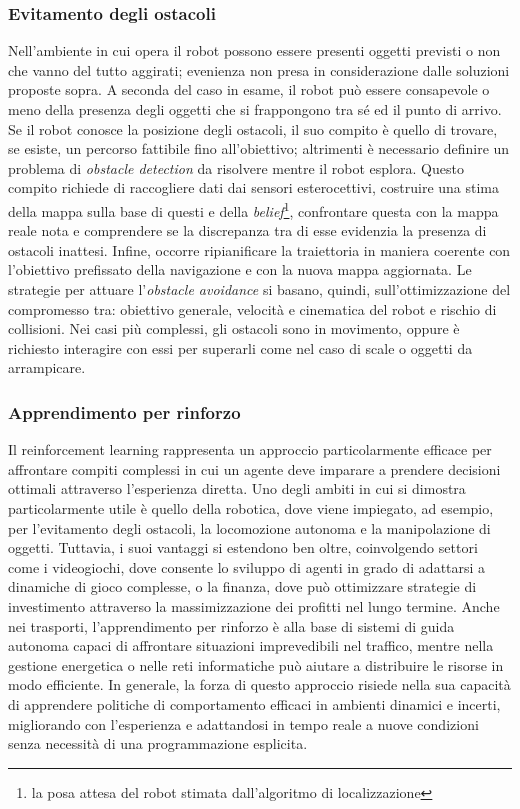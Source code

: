 \subsubsection{Evitamento degli ostacoli}
Nell'ambiente in cui opera il robot possono essere presenti oggetti previsti o non che vanno del tutto aggirati; evenienza non presa in considerazione dalle soluzioni proposte sopra. A seconda del caso in esame, il robot può essere consapevole o meno della presenza degli oggetti che si frappongono tra sé ed il punto di arrivo. Se il robot conosce la posizione degli ostacoli, il suo compito è quello di trovare, se esiste, un percorso fattibile fino all'obiettivo; altrimenti è necessario definire un problema di \textit{obstacle detection} da risolvere mentre il robot esplora. Questo compito richiede di raccogliere dati dai sensori esterocettivi, costruire una stima della mappa sulla base di questi e della \textit{belief}\footnote{la posa attesa del robot stimata dall'algoritmo di localizzazione}, confrontare questa con la mappa reale nota e comprendere se la discrepanza tra di esse evidenzia la presenza di ostacoli inattesi. Infine, occorre ripianificare la traiettoria in maniera coerente con l'obiettivo prefissato della navigazione e con la nuova mappa aggiornata. Le strategie per attuare l'\textit{obstacle avoidance} si basano, quindi, sull'ottimizzazione del compromesso tra: obiettivo generale, velocità e cinematica del robot e rischio di collisioni. Nei casi più complessi, gli ostacoli sono in movimento, oppure è richiesto interagire con essi per superarli come nel caso di scale o oggetti da arrampicare.


\subsubsection{Apprendimento per rinforzo}
Il reinforcement learning rappresenta un approccio particolarmente efficace per affrontare compiti complessi in cui un agente deve imparare a prendere decisioni ottimali attraverso l’esperienza diretta. Uno degli ambiti in cui si dimostra particolarmente utile è quello della robotica, dove viene impiegato, ad esempio, per l’evitamento degli ostacoli, la locomozione autonoma e la manipolazione di oggetti. Tuttavia, i suoi vantaggi si estendono ben oltre, coinvolgendo settori come i videogiochi, dove consente lo sviluppo di agenti in grado di adattarsi a dinamiche di gioco complesse, o la finanza, dove può ottimizzare strategie di investimento attraverso la massimizzazione dei profitti nel lungo termine. Anche nei trasporti, l'apprendimento per rinforzo è alla base di sistemi di guida autonoma capaci di affrontare situazioni imprevedibili nel traffico, mentre nella gestione energetica o nelle reti informatiche può aiutare a distribuire le risorse in modo efficiente. In generale, la forza di questo approccio risiede nella sua capacità di apprendere politiche di comportamento efficaci in ambienti dinamici e incerti, migliorando con l’esperienza e adattandosi in tempo reale a nuove condizioni senza necessità di una programmazione esplicita.


